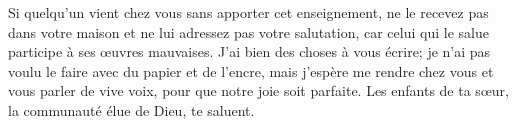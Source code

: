 Si quelqu’un vient chez vous sans apporter cet enseignement,
	ne le recevez pas dans votre maison et ne lui adressez pas votre salutation,
	car celui qui le salue participe à ses œuvres mauvaises.
J’ai bien des choses à vous écrire;
	je n’ai pas voulu le faire avec du papier et de l’encre,
	mais j’espère me rendre chez vous et vous parler de vive voix,
	pour que notre joie soit parfaite.
Les enfants de ta sœur, la communauté élue de Dieu, te saluent.
